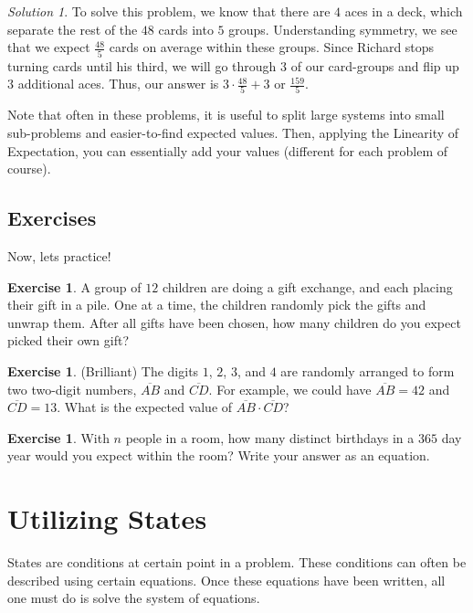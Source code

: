 \documentclass[letterpaper]{article}
\theoremstyle{definition}
\theoremstyle{remark}
\newtheorem*{solution}{Solution}
\theoremstyle{definition}
\newtheorem{exercise}[thm]{Exercise}
\begin{document}
\begin{solution}
To solve this problem, we know that there are $4$ aces in a deck, which separate the rest of the $48$ cards into $5$ groups. Understanding symmetry, we see that we expect $\frac{48}{5}$ cards on average within these groups. Since Richard stops turning cards until his third, we will go through $3$ of our card-groups and flip up $3$ additional aces. Thus, our answer is $3\cdot\frac{48}{5} + 3$ or $\frac{159}{5}$.
\end{solution}

Note that often in these problems, it is useful to split large systems into small sub-problems and easier-to-find expected values. Then, applying the Linearity of Expectation, you can essentially add your values (different for each problem of course).

\subsection*{Exercises}
Now, lets practice!

\begin{exercise}
    A group of $12$ children are doing a gift exchange, and each placing their gift in a pile. One at a time, the children randomly pick the gifts and unwrap them. After all gifts have been chosen, how many children do you expect picked their own gift?
\end{exercise}

\begin{exercise}
    (Brilliant) The digits $1$, $2$, $3$, and $4$ are randomly arranged to form two two-digit numbers, $\overline{AB}$ and $\overline{CD}$. For example, we could have $\overline{AB} = 42$ and $\overline{CD} = 13$. What is the expected value of $\overline{AB}\cdot \overline{CD}$? 
\end{exercise}

\begin{exercise}
    With $n$ people in a room, how many distinct birthdays in a $365$ day year would you expect within the room? Write your answer as an equation.
\end{exercise}

\section{Utilizing States}
States are conditions at certain point in a problem. These conditions can often be described using certain equations. Once these equations have been written, all one must do is solve the system of equations.
\end{document}
